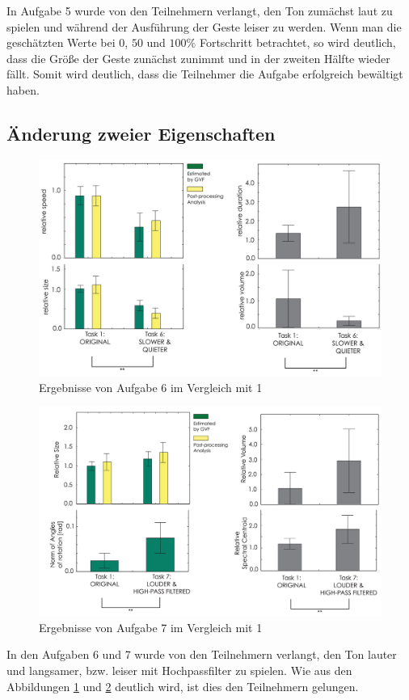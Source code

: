 \documentclass{llncs}
\begin{document}
In Aufgabe 5 wurde von den Teilnehmern verlangt, den Ton zumächst laut zu spielen und während der Ausführung der Geste leiser zu werden. Wenn man die geschätzten Werte bei $0$, $50$ und $100\%$ Fortschritt betrachtet, so wird deutlich, dass die Größe der Geste zunächst zunimmt und in der zweiten Hälfte wieder fällt. Somit wird deutlich, dass die Teilnehmer die Aufgabe erfolgreich bewältigt haben.

\subsection{Änderung zweier Eigenschaften}
\begin{figure}
\centering
\includegraphics[width=0.7\linewidth]{../Bilder/Fig17}
\caption{Ergebnisse von Aufgabe 6 im Vergleich mit 1}
\label{fig:Fig17}
\end{figure}
\begin{figure}
\centering
\includegraphics[width=0.7\linewidth]{../Bilder/Fig18}
\caption{Ergebnisse von Aufgabe 7 im Vergleich mit 1}
\label{fig:Fig18}
\end{figure}

In den Aufgaben 6 und 7 wurde von den Teilnehmern verlangt, den Ton lauter und langsamer, bzw. leiser mit Hochpassfilter zu spielen. Wie aus den Abbildungen \ref{fig:Fig17} und \ref{fig:Fig18} deutlich wird, ist dies den Teilnehmern gelungen.
\end{document}
